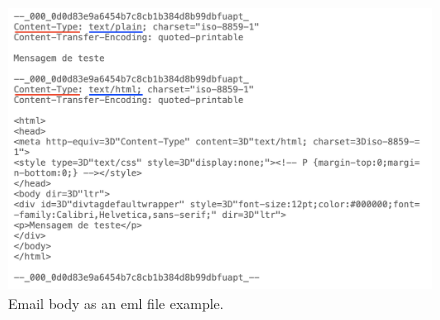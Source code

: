 \begin{figure}[H]
    \includegraphics[width=\linewidth]{figs/eml_body.png}
    \caption{Email body as an \ac{eml} file example.}
    \label{fig:c2:eml_body}
  \end{figure}